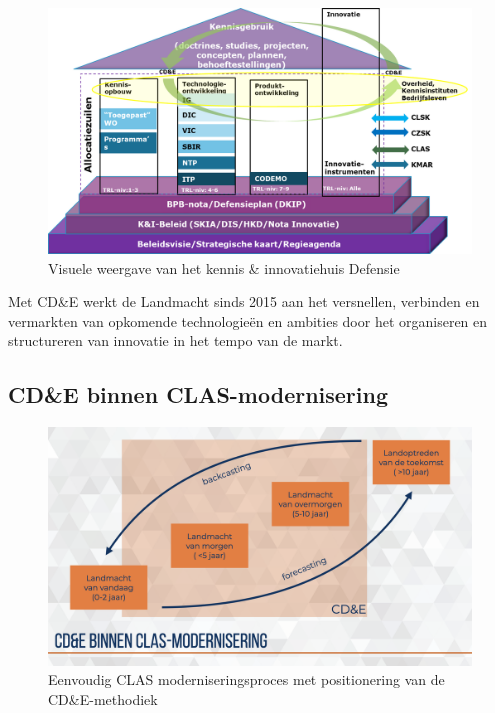 \documentclass[
]{book}
\begin{document}
\begin{figure}
\includegraphics[width=18.6in]{data/images/BO-2016-Defensie-KI-huis} \caption{Visuele weergave van het kennis \& innovatiehuis Defensie}\label{fig:ki-test}
\end{figure}

Met CD\&E werkt de Landmacht sinds 2015 aan het versnellen, verbinden en vermarkten van opkomende technologieën en ambities door het organiseren en structureren van innovatie in het tempo van de markt.

\hypertarget{cde-binnen-clas-modernisering}{%
\subsection*{CD\&E binnen CLAS-modernisering}\label{cde-binnen-clas-modernisering}}

\begin{figure}
\includegraphics[width=26.67in]{data/keynote-slides/20200430-CDE-Designprocess/20200430-CDE-Designprocess.008} \caption{Eenvoudig CLAS moderniseringsproces met positionering van de CD\&E-methodiek}\label{fig:simpel-proces}
\end{figure}
\end{document}
